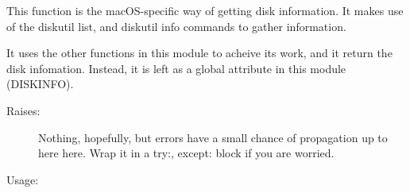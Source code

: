 \documentclass[letterpaper,10pt,english]{sphinxmanual}
\begin{document}

\begin{fulllineitems}
\label{\detokenize{macos:getdevinfo.macos.get_info}}
This function is the macOS-specific way of getting disk information.
It makes use of the diskutil list, and diskutil info commands to gather
information.

It uses the other functions in this module to acheive its work, and
it  return the disk infomation. Instead, it is left as a
global attribute in this module (DISKINFO).
\begin{description}
\item[{Raises:}] \leavevmode
Nothing, hopefully, but errors have a small chance of propagation
up to here here. Wrap it in a try:, except: block if you are worried.

\end{description}

Usage:

\begin{sphinxVerbatim}[commandchars=\\\{\}]
\end{sphinxVerbatim}

\end{fulllineitems}

\end{document}
